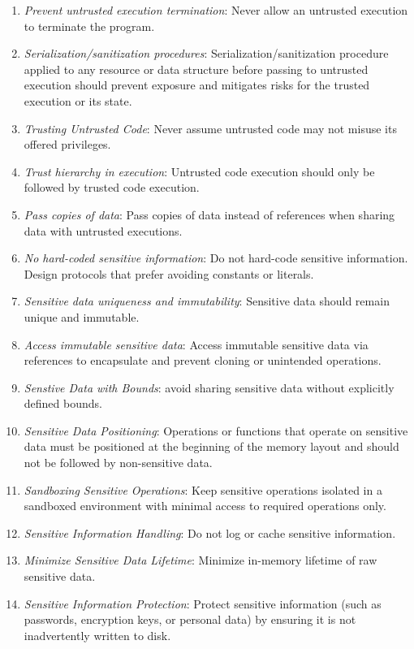 \documentclass[9pt]{IEEEtran} %
\begin{document}
\begin{enumerate}
  \item \textit{Prevent untrusted execution termination}: Never allow an untrusted execution to terminate the program.
  \item \textit{Serialization/sanitization procedures}: Serialization/sanitization procedure applied to any resource or data structure before passing to untrusted execution should prevent exposure and mitigates risks for the trusted execution or its state.
  \item \textit{Trusting Untrusted Code}: Never assume untrusted code may not misuse its offered privileges.
  \item \textit{Trust hierarchy in execution}: Untrusted code execution should only be followed by trusted code execution.
  \item \textit{Pass copies of data}: Pass copies of data instead of references when sharing data with untrusted executions.
  \item \textit{No hard-coded sensitive information}: Do not hard-code sensitive information. Design protocols that prefer avoiding constants or literals.
  \item \textit{Sensitive data uniqueness and immutability}: Sensitive data should remain unique and immutable.
  \item \textit{Access immutable sensitive data}: Access immutable sensitive data via references to encapsulate and prevent cloning or unintended operations.
  \item \textit{Senstive Data with Bounds}: avoid sharing sensitive data without explicitly defined bounds.
  \item \textit{Sensitive Data Positioning}: Operations or functions that operate on sensitive data must be positioned at the beginning of the memory layout and should not be followed by non-sensitive data. 
  \item \textit{Sandboxing Sensitive Operations}: Keep sensitive operations isolated in a sandboxed environment with minimal access to required operations only.
  \item \textit{Sensitive Information Handling}: Do not log or cache sensitive information.
  \item \textit{Minimize Sensitive Data Lifetime}: Minimize in-memory lifetime of raw sensitive data.
  \item \textit{Sensitive Information Protection}: Protect sensitive information (such as passwords, encryption keys, or personal data) by ensuring it is not inadvertently written to disk.

\end{enumerate}
\end{document}
